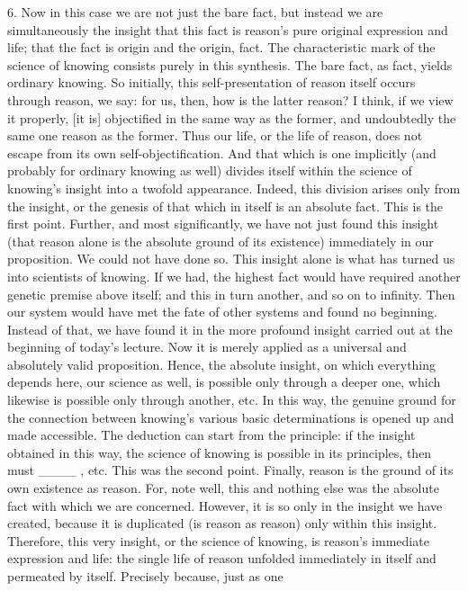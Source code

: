 6. Now in this case we are not just the bare fact,
but instead we are simultaneously
the insight that this fact is
reason’s pure original expression and life;
that the fact is origin and the origin, fact.
The characteristic mark of the science of knowing
consists purely in this synthesis.
The bare fact, as fact, yields ordinary knowing.
So initially, this self-presentation of reason
itself occurs through reason, we say:
for us, then, how is the latter reason?
I think, if we view it properly,
[it is] objectified in the same way as the former,
and undoubtedly the same one reason as the former.
Thus our life, or the life of reason,
does not escape from its own self-objectification.
And that which is one implicitly
(and probably for ordinary knowing as well)
divides itself within the science of knowing’s
insight into a twofold appearance.
Indeed, this division arises only from the insight,
or the genesis of that which in itself is an absolute fact.
This is the first point.
Further, and most significantly,
we have not just found this insight
(that reason alone is the absolute ground of its existence)
immediately in our proposition.
We could not have done so.
This insight alone is what has
turned us into scientists of knowing.
If we had, the highest fact would have required
another genetic premise above itself;
and this in turn another, and so on to infinity.
Then our system would have met the fate
of other systems and found no beginning.
Instead of that, we have found it
in the more profound insight
carried out at the beginning of today’s lecture.
Now it is merely applied as
a universal and absolutely valid proposition.
Hence, the absolute insight,
on which everything depends here,
our science as well, is possible only through a deeper one,
which likewise is possible only through another, etc.
In this way, the genuine ground for the connection
between knowing’s various basic determinations is
opened up and made accessible.
The deduction can start from the principle:
if the insight obtained in this way,
the science of knowing is possible in its principles,
then must ____ , etc.
This was the second point.
Finally, reason is the ground of its own existence as reason.
For, note well, this and nothing else was
the absolute fact with which we are concerned.
However, it is so only in the insight we have created,
because it is duplicated (is reason as reason)
only within this insight.
Therefore, this very insight,
or the science of knowing, is
reason’s immediate expression and life:
the single life of reason unfolded
immediately in itself and permeated by itself.
Precisely because, just as one
